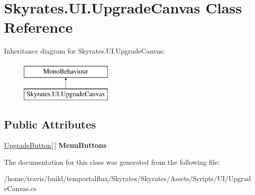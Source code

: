 \hypertarget{class_skyrates_1_1_u_i_1_1_upgrade_canvas}{\section{Skyrates.\-U\-I.\-Upgrade\-Canvas Class Reference}
\label{class_skyrates_1_1_u_i_1_1_upgrade_canvas}
}
Inheritance diagram for Skyrates.\-U\-I.\-Upgrade\-Canvas\-:\begin{figure}[H]
\begin{center}
\leavevmode
\includegraphics[height=2.000000cm]{class_skyrates_1_1_u_i_1_1_upgrade_canvas}
\end{center}
\end{figure}
\subsection*{Public Attributes}
\begin{DoxyCompactItemize}
\item 
\hypertarget{class_skyrates_1_1_u_i_1_1_upgrade_canvas_a0d8db519ea20c20635cde2763b173a5a}{\hyperlink{class_skyrates_1_1_u_i_1_1_upgrade_button}{Upgrade\-Button}\mbox{[}$\,$\mbox{]} {\bfseries Menu\-Buttons}}\label{class_skyrates_1_1_u_i_1_1_upgrade_canvas_a0d8db519ea20c20635cde2763b173a5a}

\end{DoxyCompactItemize}


The documentation for this class was generated from the following file\-:\begin{DoxyCompactItemize}
\item 
/home/travis/build/temportalflux/\-Skyrates/\-Skyrates/\-Assets/\-Scripts/\-U\-I/Upgrade\-Canvas.\-cs\end{DoxyCompactItemize}
